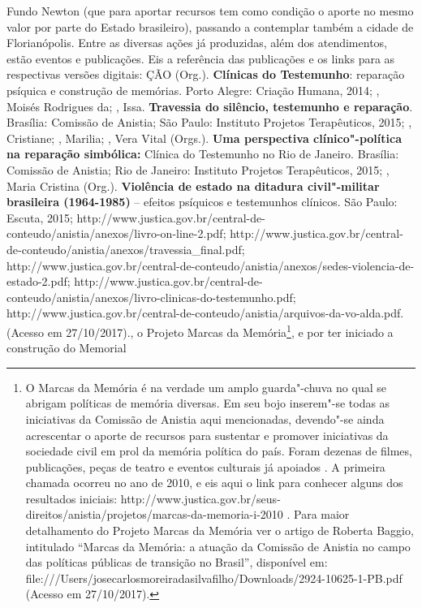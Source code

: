 {  Fundo Newton (que para aportar recursos tem como condição o aporte no
  mesmo valor por parte do Estado brasileiro), passando a contemplar
  também a cidade de Florianópolis. Entre as diversas ações já
  produzidas, além dos atendimentos, estão eventos e publicações. Eis a
  referência das publicações e os links para as respectivas versões
  digitais:   ÇÃO  (Org.).
  \textbf{Clínicas do Testemunho}: reparação psíquica e construção de
  memórias. Porto Alegre: Criação Humana, 2014;  , Moisés
  Rodrigues da; , Issa. \textbf{Travessia do silêncio,
  testemunho e reparação}. Brasília: Comissão de Anistia; São Paulo:
  Instituto Projetos Terapêuticos, 2015; , Cristiane; ,
  Marilia; , Vera Vital (Orgs.). \textbf{Uma perspectiva
  clínico"-política na reparação simbólica:} Clínica do Testemunho no Rio
  de Janeiro. Brasília: Comissão de Anistia; Rio de Janeiro: Instituto
  Projetos Terapêuticos, 2015; , Maria Cristina (Org.).
  \textbf{Violência de estado na ditadura civil"-militar brasileira
  (1964-1985)} -- efeitos psíquicos e testemunhos clínicos. São Paulo:
  Escuta, 2015;
  http://www.justica.gov.br/central-de-conteudo/anistia/anexos/livro-on-line-2.pdf;
  http://www.justica.gov.br/central-de-conteudo/anistia/anexos/travessia\_final.pdf;
  http://www.justica.gov.br/central-de-conteudo/anistia/anexos/sedes-violencia-de-estado-2.pdf;
  http://www.justica.gov.br/central-de-conteudo/anistia/anexos/livro-clinicas-do-testemunho.pdf;
  http://www.justica.gov.br/central-de-conteudo/anistia/arquivos-da-vo-alda.pdf.
  (Acesso em 27/10/2017).}, o Projeto Marcas da Memória\footnote{O
  Marcas da Memória é na verdade um amplo guarda"-chuva no qual se
  abrigam políticas de memória diversas. Em seu bojo inserem"-se todas as
  iniciativas da Comissão de Anistia aqui mencionadas, devendo"-se ainda
  acrescentar o aporte de recursos para sustentar e promover iniciativas
  da sociedade civil em prol da memória política do país. Foram dezenas
  de filmes, publicações, peças de teatro e eventos culturais já
  apoiados . A primeira chamada ocorreu no ano de 2010, e eis aqui o
  link para conhecer alguns dos resultados iniciais:
  http://www.justica.gov.br/seus-direitos/anistia/projetos/marcas-da-memoria-i-2010
  . Para maior detalhamento do Projeto Marcas da Memória ver o artigo de
  Roberta Baggio, intitulado ``Marcas da Memória: a atuação da Comissão
      de Anistia no campo das políticas públicas de transição no Brasil'',
  disponível em:
  file:///Users/josecarlosmoreiradasilvafilho/Downloads/2924-10625-1-PB.pdf
  (Acesso em 27/10/2017).}, e por ter iniciado a construção do Memorial
